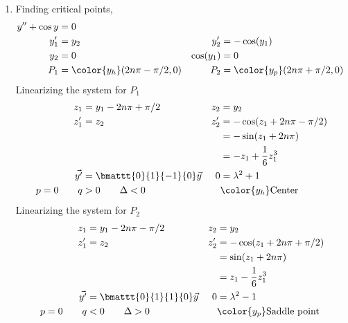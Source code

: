 \begin{enumerate}
    \item Finding critical points,
          \begin{align}
              y'' + \cos y & = 0                                \\
              y_1'         & = y_2                            &
              y_2'         & = -\cos(y_1)                       \\
              y_2          & = 0                              &
              \cos(y_1)    & = 0                                \\
              P_1          & = \color{y_h}(2n\pi - \pi/2, 0)  &
              P_2          & = \color{y_p} (2n\pi + \pi/2, 0)   \\
          \end{align}
          Linearizing the system for $ P_1 $
          \begin{align}
              z_1            & = y_1 - 2n\pi + \pi/2          &
              z_2            & = y_2                            \\
              z_1'           & = z_2                          &
              z_2'           & = -\cos(z_1 + 2n\pi - \pi/2)     \\
                             &                                &
                             & = -\sin(z_1 + 2n\pi)             \\
                             &                                &
                             & = -z_1 + \frac{1}{6}z_1^{3}      \\
              \vec{y'}       & = \bmattt{0}{1}{-1}{0} \vec{y} &
              0              & = \lambda^{2} + 1                \\
              p = 0 \qquad q & > 0 \qquad \Delta < 0          &
                             & \color{y_h} \text{Center}
          \end{align}
          Linearizing the system for $ P_2 $
          \begin{align}
              z_1            & = y_1 - 2n\pi - \pi/2           &
              z_2            & = y_2                             \\
              z_1'           & = z_2                           &
              z_2'           & = -\cos(z_1 + 2n\pi + \pi/2)      \\
                             &                                 &
                             & = \sin(z_1 + 2n\pi)               \\
                             &                                 &
                             & = z_1 - \frac{1}{6}z_1^{3}        \\
              \vec{y'}       & = \bmattt{0}{1}{1}{0} \vec{y}   &
              0              & = \lambda^{2} - 1                 \\
              p = 0 \qquad q & < 0 \qquad \Delta > 0           &
                             & \color{y_p} \text{Saddle point}
          \end{align}


\end{enumerate}
